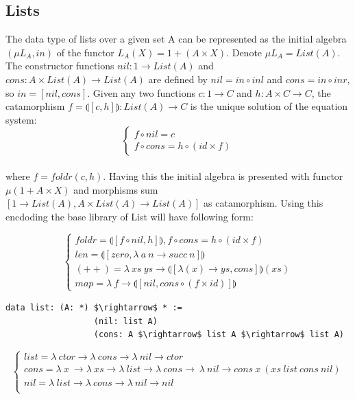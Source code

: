 \documentclass[11pt,oneside]{article}
\begin{document}
\subsection{Lists}
The data type of lists over a given set A can be represented as the initial algebra
$(\mu L_A, in)$ of the functor $L_A(X) = 1 + (A \times X)$. Denote $\mu L_A = List(A)$.
The constructor functions $nil: 1 \rightarrow List(A)$ and
$cons: A \times List(A) \rightarrow List(A)$ are defined by
$nil = in \circ inl$ and $cons = in \circ inr$, so $in = [nil,cons]$.
Given any two functions $c: 1 \rightarrow C$ and $h: A \times C \rightarrow C$,
the catamorphism $f = \llparenthesis [c,h] \rrparenthesis : List(A) \rightarrow C$
is the unique solution of the equation system:
\vspace{0.3cm}
$$
\begin{cases}
  f \circ nil  = c \\
  f \circ cons = h \circ (id \times f)
\end{cases}
$$

\paragraph{}
where $f = foldr(c,h)$. Having this the initial algebra is presented with functor
$\mu (1 + A \times X)$ and morphisms sum $[1 \rightarrow List(A), A \times List(A) \rightarrow List(A)]$
as catamorphism. Using this encdoding the base library of List will have following form:

\vspace{0.5cm}
$$
\begin{cases}
foldr = \llparenthesis [ f \circ nil , h] \rrparenthesis, f \circ cons = h \circ (id \times f)\\
len = \llparenthesis [ zero, \lambda\ a\ n \rightarrow succ\ n ] \rrparenthesis \\
(++) = \lambda\ xs\ ys \rightarrow \llparenthesis [ \lambda (x) \rightarrow ys, cons ] \rrparenthesis (xs) \\
map = \lambda\ f \rightarrow \llparenthesis [ nil, cons \circ (f \times id)] \rrparenthesis
\end{cases}
$$

\begin{lstlisting}[mathescape=true]
             data list: (A: *) $\rightarrow$ * :=
                  (nil: list A)
                  (cons: A $\rightarrow$ list A $\rightarrow$ list A)
\end{lstlisting}

$$
\begin{cases}
list = \lambda\ ctor \rightarrow \lambda\ cons \rightarrow \lambda\ nil \rightarrow ctor\\
cons = \lambda\ x\ \rightarrow \lambda\ xs \rightarrow \lambda\ list \rightarrow \lambda\ cons \rightarrow\ \lambda\ nil \rightarrow cons\ x\ (xs\ list\ cons\ nil)\\
nil = \lambda\ list \rightarrow \lambda\ cons \rightarrow \lambda\ nil \rightarrow nil\\
\end{cases}
$$
\end{document}

